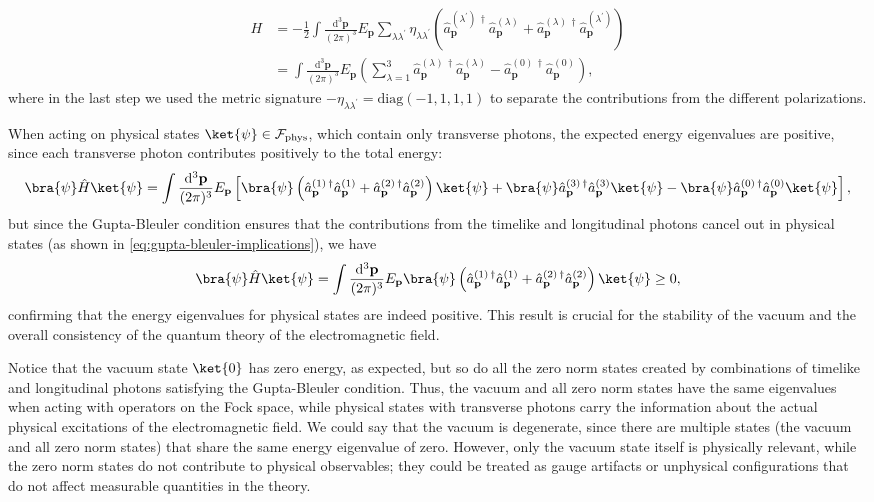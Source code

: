 \[
    \begin{aligned}
        H & = - \frac{1}{2} \int \frac{\mathrm{d}^3 \mathbf{p}}{(2\pi)^3} E_{\mathbf{p}} \sum_{\lambda \lambda^{\prime}} \eta_{\lambda \lambda^{\prime}} \left( \hat{a}^{(\lambda^{\prime})\,\dagger}_{\mathbf{p}} \hat{a}^{(\lambda)}_{\mathbf{p}} + \hat{a}^{(\lambda)\,\dagger}_{\mathbf{p}} \hat{a}^{(\lambda^{\prime})}_{\mathbf{p}} \right) \\
          & = \int \frac{\mathrm{d}^3 \mathbf{p}}{(2\pi)^3} E_{\mathbf{p}} \left( \sum_{\lambda = 1}^3  \hat{a}^{(\lambda)\,\dagger}_{\mathbf{p}}  \hat{a}^{(\lambda)}_{\mathbf{p}} - \hat{a}^{(0)\,\dagger}_{\mathbf{p}}\hat{a}^{(0)}_{\mathbf{p}} \right),
    \end{aligned}
\]
where in the last step we used the metric signature \(-\eta_{\lambda \lambda^{\prime}} = \text{diag}(-1, 1, 1, 1)\) to separate the contributions from the different polarizations.

When acting on physical states \(\ket{\psi} \in \mathcal{F}_{\text{phys}}\), which contain only transverse photons, the expected energy eigenvalues are positive, since each transverse photon contributes positively to the total energy:
\[
    \bra{\psi} \hat{H} \ket{\psi} = \int \frac{\mathrm{d}^3 \mathbf{p}}{(2\pi)^3} E_{\mathbf{p}} \left[ \bra{\psi}\left( \hat{a}^{(1)\,\dagger}_{\mathbf{p}}  \hat{a}^{(1)}_{\mathbf{p}} + \hat{a}^{(2)\,\dagger}_{\mathbf{p}}  \hat{a}^{(2)}_{\mathbf{p}} \right)\ket{\psi} + \bra{\psi} \hat{a}^{(3)\,\dagger}_{\mathbf{p}}\hat{a}^{(3)}_{\mathbf{p}}\ket{\psi} - \bra{\psi} \hat{a}^{(0)\,\dagger}_{\mathbf{p}}\hat{a}^{(0)}_{\mathbf{p}}\ket{\psi} \right],
\]
but since the Gupta-Bleuler condition ensures that the contributions from the timelike and longitudinal photons cancel out in physical states (as shown in \cref{eq:gupta-bleuler-implications}), we have
\[
    \bra{\psi} \hat{H} \ket{\psi} = \int \frac{\mathrm{d}^3 \mathbf{p}}{(2\pi)^3} E_{\mathbf{p}} \bra{\psi}\left( \hat{a}^{(1)\,\dagger}_{\mathbf{p}}  \hat{a}^{(1)}_{\mathbf{p}} + \hat{a}^{(2)\,\dagger}_{\mathbf{p}}  \hat{a}^{(2)}_{\mathbf{p}} \right)\ket{\psi} \geq 0,
\]
confirming that the energy eigenvalues for physical states are indeed positive. This result is crucial for the stability of the vacuum and the overall consistency of the quantum theory of the electromagnetic field.

Notice that the vacuum state \(\ket{0}\) has zero energy, as expected, but so do all the zero norm states created by combinations of timelike and longitudinal photons satisfying the Gupta-Bleuler condition. Thus, the vacuum and all zero norm states have the same eigenvalues when acting with operators on the Fock space, while physical states with transverse photons carry the information about the actual physical excitations of the electromagnetic field. We could say that the vacuum is degenerate, since there are multiple states (the vacuum and all zero norm states) that share the same energy eigenvalue of zero. However, only the vacuum state itself is physically relevant, while the zero norm states do not contribute to physical observables; they could be treated as gauge artifacts or unphysical configurations that do not affect measurable quantities in the theory.
